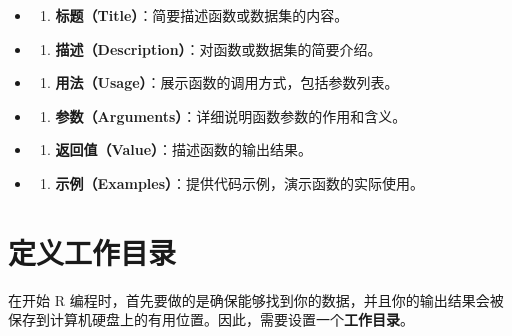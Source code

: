 \documentclass[
]{book}
\providecommand{\tightlist}{%
  \setlength{\itemsep}{0pt}\setlength{\parskip}{0pt}}
\begin{document}
\begin{itemize}
\item
  \begin{enumerate}
  \def\labelenumi{\arabic{enumi}.}
  \tightlist
  \item
    \textbf{标题（Title）}：简要描述函数或数据集的内容。
  \end{enumerate}
\item
  \begin{enumerate}
  \def\labelenumi{\arabic{enumi}.}
  \setcounter{enumi}{1}
  \tightlist
  \item
    \textbf{描述（Description）}：对函数或数据集的简要介绍。
  \end{enumerate}
\item
  \begin{enumerate}
  \def\labelenumi{\arabic{enumi}.}
  \setcounter{enumi}{2}
  \tightlist
  \item
    \textbf{用法（Usage）}：展示函数的调用方式，包括参数列表。
  \end{enumerate}
\item
  \begin{enumerate}
  \def\labelenumi{\arabic{enumi}.}
  \setcounter{enumi}{3}
  \tightlist
  \item
    \textbf{参数（Arguments）}：详细说明函数参数的作用和含义。
  \end{enumerate}
\item
  \begin{enumerate}
  \def\labelenumi{\arabic{enumi}.}
  \setcounter{enumi}{4}
  \tightlist
  \item
    \textbf{返回值（Value）}：描述函数的输出结果。
  \end{enumerate}
\item
  \begin{enumerate}
  \def\labelenumi{\arabic{enumi}.}
  \setcounter{enumi}{5}
  \tightlist
  \item
    \textbf{示例（Examples）}：提供代码示例，演示函数的实际使用。
  \end{enumerate}
\end{itemize}

\section{定义工作目录}\label{ux5b9aux4e49ux5de5ux4f5cux76eeux5f55}

在开始 R 编程时，首先要做的是确保能够找到你的数据，并且你的输出结果会被保存到计算机硬盘上的有用位置。因此，需要设置一个\textbf{工作目录}。
\end{document}
